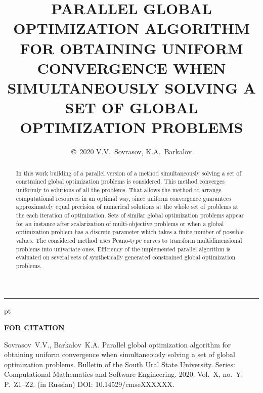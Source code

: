 \documentclass{cmi}
\begin{document}

{\phantom{eee} \hrule {} pt}
\classify{} %

\title{\uppercase{Parallel global optimization algorithm for obtaining uniform convergence
when simultaneously solving a set of global optimization problems}}

\author{\copyright~2020 V.V.~Sovrasov, K.A.~Barkalov}

\address{Lobachevsky State University of Nizhni Novgorod, Russia (pr. Gagarina 23(2), Nizhni Novgorod, 603022 Russia)}



\maketitle{}
\begin{abstract}%
  In this work building of a parallel version of a method simultaneously solving a set of
  constrained global optimization problems is considered. This method converges uniformly
  to solutions of all the problems. That allows the method to arrange computational resources in an
  optimal way, since uniform convergence guarantees approximately equal precision
  of numerical solutions at the whole set of problems at the each iteration of optimization.
  Sets of similar global optimization problems appear for an instance after scalarization
  of multi-objective problems or when a global optimization problem has a discrete parameter
  which takes a finite number of possible values. The considered method uses Peano-type curves
  to transform multidimensional problems into univariate ones. Efficiency of the implemented
  parallel algorithm is evaluated on several sets of synthetically generated constrained global optimization problems.

\end{abstract}

\begin{flushleft}
  \textbf{FOR CITATION}
\end{flushleft}
\justifying

\begin{citationplace}
Sovrasov~V.V., Barkalov~K.A. Parallel global optimization algorithm for obtaining uniform convergence
when simultaneously solving a set of global optimization problems. Bulletin of the South Ural State University. Series: Computational Mathematics and Software Engineering. 2020. Vol.~X, no.~Y. P.~Z1--Z2. (in Russian) DOI: 10.14529/cmseXXXXXX.
\end{citationplace}
\end{document}

